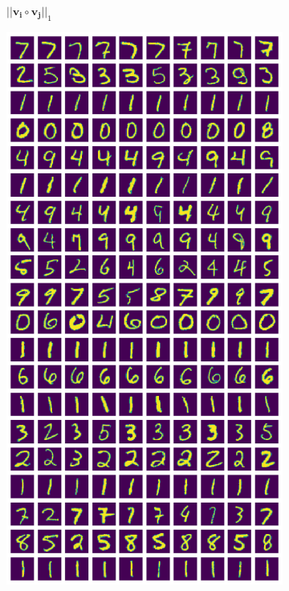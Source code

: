 \documentclass[10pt,a4paper, nocenter]{report}
\begin{document}
\begin{enumerate}
\begin{figure}[h]
\begin{center}
\begin{subfigure}[b]{0.4\textwidth}
                    \caption{$\lvert \lvert \mathbf{v_i} \circ \mathbf{v_j} \rvert \rvert_1$ \vspace{10pt} }
                    \label{fig:clustering_20_0norm}
                \end{subfigure}
                \begin{subfigure}[b]{0.4\textwidth}
                    \centering
                    \includegraphics[width=\textwidth]{../../images/number_clustering_20_2norm.png}

\end{subfigure}
\end{center}
\end{figure}
\end{enumerate}
\end{document}
